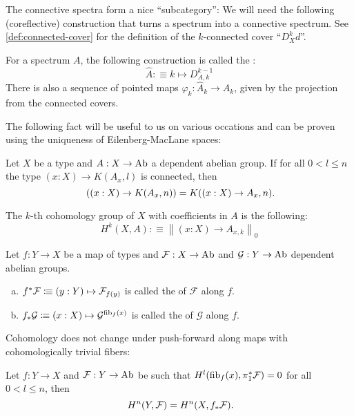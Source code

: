 The connective spectra form a nice ``subcategory'':
We will need the following (coreflective) construction that turns a spectrum into a connective spectrum.
See \cref{def:connected-cover} for the definition of the $k$-connected cover ``$D^k_Xd$''.

\begin{definition}
  For a spectrum $A$,
  the following construction is called the :
  \[ \hat{A}:\equiv k\mapsto D_{A,k}^{k-1}\]
  There is also a sequence of pointed maps $\varphi_k:\hat{A}_k\to A_k$, given by the projection from the connected covers.
\end{definition}

The following fact will be useful to us on various occations and can be proven using the uniqueness of Eilenberg-MacLane spaces:

\begin{lemma}
  \label{em-comm-pi}
  Let $X$ be a type and $A:X\to\operatorname{Ab}$ a dependent abelian group.
  If for all $0<l\leq n$ the type $(x:X)\to K(A_x,l)$ is connected, then
  \[
    ((x:X)\to K(A_x,n)) = K((x:X)\to A_x,n)
    \rlap{.}
  \]
\end{lemma}

\begin{definition}
  The $k$-th cohomology group of $X$ with coefficients in $A$ is the following:
  \[ H^k(X,A):\equiv\left\|(x:X)\to A_{x,k}\right\|_0 \]
\end{definition}

\begin{definition}
  Let $f:Y\to X$ be a map of types and $\mathcal F:X\to \operatorname{Ab}$ and $\mathcal G:Y\to \operatorname{Ab}$ dependent abelian groups.
  \begin{enumerate}[(a)]
  \item $f^\ast \mathcal F\vcentcolon\mspace{-1.2mu}\equiv (y:Y)\mapsto \mathcal F_{f(y)}$ is called the  of $\mathcal F$ along $f$.
  \item $f_{\ast}\mathcal G\vcentcolon\mspace{-1.2mu}\equiv (x:X)\mapsto \mathcal G^{\mathrm{fib}_f(x)}$ is called the  of $\mathcal G$ along $f$.
  \end{enumerate}
\end{definition}

Cohomology does not change under push-forward along maps with cohomologically trivial fibers:

\begin{lemma}
  \label{cohomologically-trivial-fibers}
  Let $f:Y\to X$ and $\mathcal F:Y\to\operatorname{Ab}$ be such that $H^l(\mathrm{fib}_f(x),\pi_1^\ast\mathcal F)=0$ for all $0<l\leq n$,
  then
  \[
    H^n(Y,\mathcal F)=H^n(X,f_\ast\mathcal F)
    \rlap{.}
  \]
\end{lemma}

